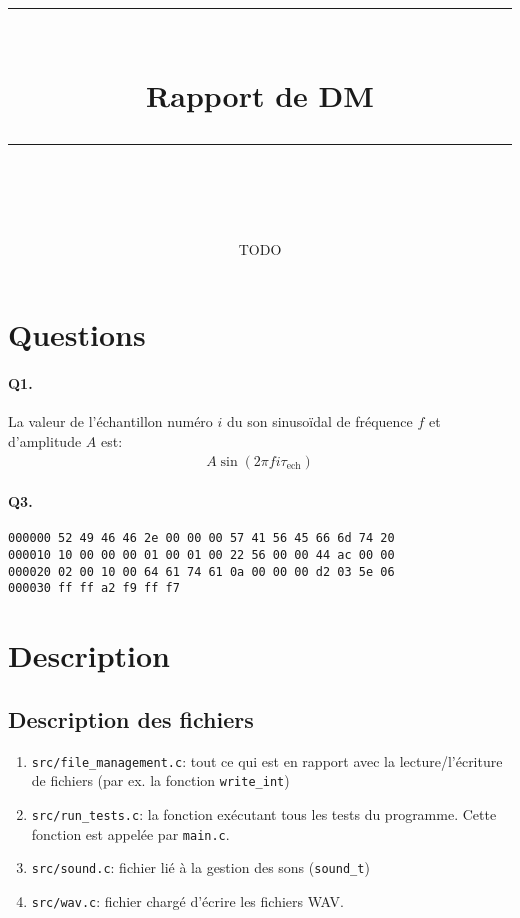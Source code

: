 \documentclass[11pt]{article} %
\title{
    \vspace{10pt} %
    \rule{\linewidth}{1pt}\\ %
    \vspace{10pt} %
    {\huge Rapport de DM}\\ %
    \rule{\linewidth}{1pt}\\ %
    \vspace{5pt} %
}
\date{\printdate{2024-12-29}}
\author{TODO}
\newcommand{\nbsp}{\nobreakspace}
\begin{document}
\maketitle{}

\section{Questions}
\paragraph{Q1.}
La valeur de l’échantillon numéro $i$ du son sinusoïdal de fréquence $f$ et
d’amplitude $A$ est\nbsp:
\begin{align*}
A \sin(2\pi f i \tau_\text{ech})
\end{align*}

\paragraph{Q3.}
\nbsp

\begin{lstlisting}
000000 52 49 46 46 2e 00 00 00 57 41 56 45 66 6d 74 20
000010 10 00 00 00 01 00 01 00 22 56 00 00 44 ac 00 00
000020 02 00 10 00 64 61 74 61 0a 00 00 00 d2 03 5e 06
000030 ff ff a2 f9 ff f7
\end{lstlisting}

\section{Description}

\subsection{Description des fichiers}
\begin{enumerate}
    \item \verb|src/file_management.c|\nbsp: tout ce qui est en rapport avec la
        lecture/l’écriture de fichiers (par ex. la fonction \verb|write_int|)
    \item \verb|src/run_tests.c|\nbsp: la fonction exécutant tous les tests
        du programme. Cette fonction est appelée par \verb|main.c|.
    \item \verb|src/sound.c|\nbsp: fichier lié à la gestion des sons
        (\verb|sound_t|)
    \item \verb|src/wav.c|\nbsp: fichier chargé d’écrire les fichiers WAV.
\end{enumerate}
\end{document}
